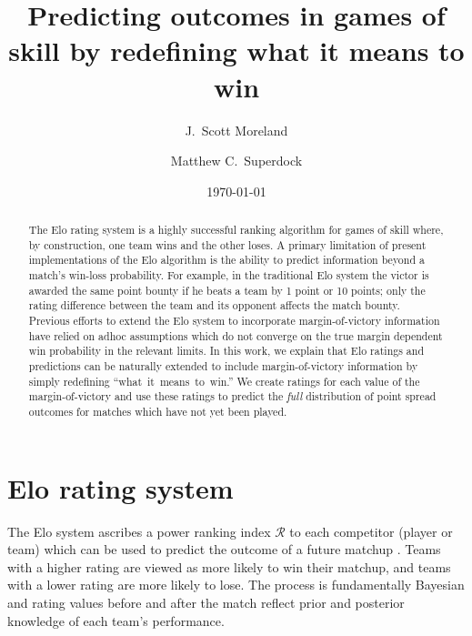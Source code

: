 \documentclass[aps,prc,reprint,amsmath,superscriptaddress,nofootinbib]{revtex4-1}
\newcommand{\R}{\mathcal{R}}
\begin{document}
\title{Predicting outcomes in games of skill by redefining what it means to win}

\author{J.\ Scott Moreland}
\author{Matthew C.\ Superdock}

\date{\today}


\begin{abstract}
The Elo rating system is a highly successful ranking algorithm for games of skill where, by construction, one team wins and the other loses.
A primary limitation of present implementations of the Elo algorithm is the ability to predict information beyond a match's win-loss probability.
For example, in the traditional Elo system the victor is awarded the same point bounty if he beats a team by 1 point or 10 points; only the rating difference between the team and its opponent affects the match bounty.
Previous efforts to extend the Elo system to incorporate margin-of-victory information have relied on adhoc assumptions which do not converge on the true margin dependent win probability in the relevant limits.
  In this work, we explain that Elo ratings and predictions can be naturally extended to include margin-of-victory information by simply redefining \mbox{``what it means to win.''}
We create ratings for each value of the margin-of-victory and use these ratings to predict the \emph{full} distribution of point spread outcomes for matches which have not yet been played.
\end{abstract}


\maketitle

\section{Elo rating system}

The Elo system ascribes a power ranking index $\R$ to each competitor (player or team) which can be used to predict the outcome of a future matchup \cite{elo1978rating}.
Teams with a higher rating are viewed as more likely to win their matchup, and teams with a lower rating are more likely to lose.
The process is fundamentally Bayesian and rating values before and after the match reflect prior and posterior knowledge of each team's performance.
\end{document}
